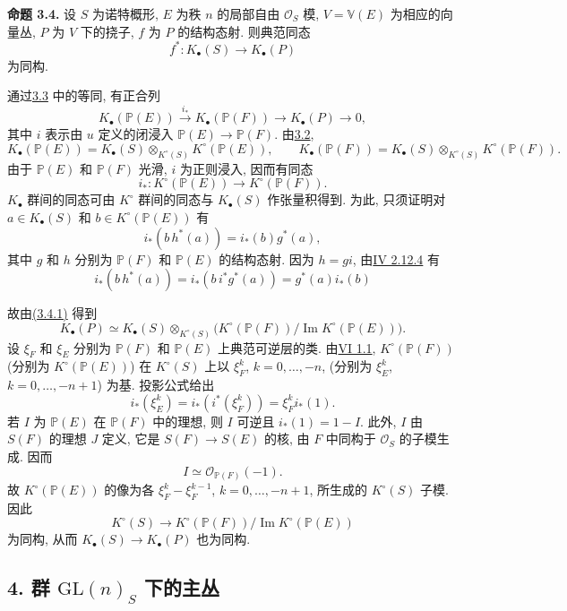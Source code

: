 \textbf{命题 3.4.} 设 $S$ 为诺特概形, $E$ 为秩 $n$ 的局部自由 $\mathcal O_S$ 模, $V=\mathbb V(E)$ 为相应的向量丛, $P$ 为 $V$ 下的挠子, $f$ 为 $P$ 的结构态射. 则典范同态
\[
 f^*:K_\bullet(S)\longrightarrow K_\bullet(P)
\]
为同构.

通过\hyperlink{sga6.e09.para.3-3}{3.3} 中的等同, 有正合列
\[
 K_\bullet(\mathbb P(E))\xrightarrow{i_*}K_\bullet(\mathbb P(F))\longrightarrow K_\bullet(P)\longrightarrow 0,
\tag{3.4.1}
\]
其中 $i$ 表示由 $u$ 定义的闭浸入 $\mathbb P(E)\to\mathbb P(F)$. 由\hyperlink{sga6.e09.cor.3-2}{3.2},
\[
 K_\bullet(\mathbb P(E))=K_\bullet(S)\otimes_{K^\circ(S)}K^\circ(\mathbb P(E)),
\qquad
 K_\bullet(\mathbb P(F))=K_\bullet(S)\otimes_{K^\circ(S)}K^\circ(\mathbb P(F)).
\]
由于 $\mathbb P(E)$ 和 $\mathbb P(F)$ 光滑, $i$ 为正则浸入, 因而有同态
\[
 i_*:K^\circ(\mathbb P(E))\longrightarrow K^\circ(\mathbb P(F)).
\]
$K_\bullet$ 群间的同态可由 $K^\circ$ 群间的同态与 $K_\bullet(S)$ 作张量积得到. 为此, 只须证明对 $a\in K_\bullet(S)$ 和 $b\in K^\circ(\mathbb P(E))$ 有
\[
 i_*(b\,h^*(a))=i_*(b)g^*(a),
\]
其中 $g$ 和 $h$ 分别为 $\mathbb P(F)$ 和 $\mathbb P(E)$ 的结构态射. 因为 $h=gi$, 由\hyperlink{sga6.e04.eq.2-12-4}{IV 2.12.4} 有
\[
 i_*(b\,h^*(a))=i_*(b\,i^*g^*(a))=g^*(a)i_*(b)
\]
%

故由\hyperlink{sga6.e09.eq.3-4-1}{(3.4.1)} 得到
\[
 K_\bullet(P)\simeq K_\bullet(S)\otimes_{K^\circ(S)}
 \bigl(K^\circ(\mathbb P(F))/\operatorname{Im}K^\circ(\mathbb P(E))\bigr).
\]
设 $\xi_F$ 和 $\xi_E$ 分别为 $\mathbb P(F)$ 和 $\mathbb P(E)$ 上典范可逆层的类. 由\hyperlink{sga6.e06.thm.1-1}{VI 1.1}, $K^\circ(\mathbb P(F))$ (分别为 $K^\circ(\mathbb P(E))$) 在 $K^\circ(S)$ 上以 $\xi_F^k$, $k=0,\ldots,-n$, (分别为 $\xi_E^k$, $k=0,\ldots,-n+1$) 为基. 投影公式给出
\[
 i_*(\xi_E^k)=i_*(i^*(\xi_F^k))=\xi_F^k i_*(1).
\]
若 $I$ 为 $\mathbb P(E)$ 在 $\mathbb P(F)$ 中的理想, 则 $I$ 可逆且 $i_*(1)=1-I$. 此外, $I$ 由 $S(F)$ 的理想 $J$ 定义, 它是 $S(F)\to S(E)$ 的核, 由 $F$ 中同构于 $\mathcal O_S$ 的子模生成. 因而
\[
 I\simeq \mathcal O_{\mathbb P(F)}(-1).
\]
故 $K^\circ(\mathbb P(E))$ 的像为各 $\xi_F^k-\xi_F^{k-1}$, $k=0,\ldots,-n+1$, 所生成的 $K^\circ(S)$ 子模. 因此
\[
 K^\circ(S)\longrightarrow K^\circ(\mathbb P(F))/\operatorname{Im}K^\circ(\mathbb P(E))
\]
为同构, 从而 $K_\bullet(S)\to K_\bullet(P)$ 也为同构.

\subsection*{4. 群 $\mathrm{GL}(n)_S$ 下的主丛}

